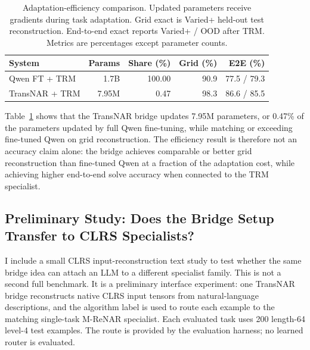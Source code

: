 \documentclass[11pt]{article}
\begin{document}
\begin{table}[!t]
\centering
\scriptsize
\setlength{\tabcolsep}{2pt}
\caption{Adaptation-efficiency comparison. Updated parameters receive gradients during task adaptation. Grid exact is Varied+ held-out test reconstruction. End-to-end exact reports Varied+ / OOD after TRM. Metrics are percentages except parameter counts.}
\label{tab:adaptation_efficiency}
\begin{tabular}{@{}lrrrr@{}}
\toprule
System & Params & Share (\%) & Grid (\%) & E2E (\%) \\
\midrule

Qwen FT + TRM  & 1.7B & 100.00 & 90.9 & 77.5 / 79.3 \\
TransNAR + TRM & 7.95M & 0.47 & 98.3 & 86.6 / 85.5 \\
\bottomrule
\end{tabular}
\end{table}

Table~\ref{tab:adaptation_efficiency} shows that the TransNAR bridge updates 7.95M parameters, or 0.47\% of the parameters updated by full Qwen fine-tuning, while matching or exceeding fine-tuned Qwen on grid reconstruction.
The efficiency result is therefore not an accuracy claim alone: the bridge achieves comparable or better grid reconstruction than fine-tuned Qwen at a fraction of the adaptation cost, while achieving higher end-to-end solve accuracy when connected to the TRM specialist.

\subsection*{Preliminary Study: Does the Bridge Setup Transfer to CLRS Specialists?}
\label{sec:clrs_preliminary_results}

I include a small CLRS input-reconstruction text study to test whether the same bridge idea can attach an LLM to a different specialist family.
This is not a second full benchmark.
It is a preliminary interface experiment: one TransNAR bridge reconstructs native CLRS input tensors from natural-language descriptions, and the algorithm label is used to route each example to the matching single-task M-ReNAR specialist. Each evaluated task uses 200 length-64 level-4 test examples.
The route is provided by the evaluation harness; no learned router is evaluated.
\end{document}
